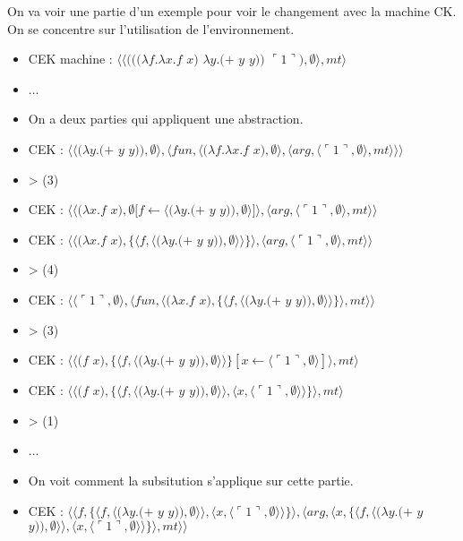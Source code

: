 \documentclass[10pt,a4paper]{article}
\begin{document}
				
				On va voir une partie d'un exemple pour voir le changement avec la machine CK. On se concentre sur l'utilisation de l'environnement.
				\medbreak
				
				\begin{itemize}
					\item[] CEK machine : $\langle\langle(((\lambda f.\lambda x.f$ $x)$ $\lambda y.(+$ $y$ $y))$ $\ulcorner 1\urcorner),\emptyset\rangle,mt\rangle$
					\item[] ...
					\item[] On a deux parties qui appliquent une abstraction.
					\item[] CEK : $\langle\langle(\lambda y.(+$ $y$ $y)),\emptyset\rangle,\langle fun,\langle(\lambda f.\lambda x.f$ $x),\emptyset\rangle,\langle arg,\langle\ulcorner 1\urcorner,\emptyset\rangle,mt\rangle\rangle\rangle$
					\item[] > (3) 
					\item[] CEK : $\langle\langle(\lambda x.f$ $x),\emptyset[f \leftarrow \langle(\lambda y.(+$ $y$ $y)),\emptyset\rangle]\rangle,\langle arg,\langle\ulcorner 1\urcorner,\emptyset\rangle,mt\rangle\rangle$
					\item[] CEK : $\langle\langle(\lambda x.f$ $x),\{\langle f,\langle(\lambda y.(+$ $y$ $y)),\emptyset\rangle\rangle\}\rangle,\langle arg,\langle\ulcorner 1\urcorner,\emptyset\rangle,mt\rangle\rangle$
					\item[] > (4) 
					\item[] CEK : $\langle\langle\ulcorner 1\urcorner,\emptyset\rangle,\langle fun,\langle(\lambda x.f$ $x),\{\langle f,\langle(\lambda y.(+$ $y$ $y)),\emptyset\rangle\rangle\}\rangle,mt\rangle\rangle$
					\item[] > (3) 
					\item[] CEK : $\langle\langle(f$ $x),\{\langle f,\langle(\lambda y.(+$ $y$ $y)),\emptyset\rangle\rangle\}[x \leftarrow \langle\ulcorner 1\urcorner,\emptyset\rangle]\rangle,mt\rangle$
					\item[] CEK : $\langle\langle(f$ $x),\{\langle f,\langle(\lambda y.(+$ $y$ $y)),\emptyset\rangle\rangle,\langle x,\langle\ulcorner 1\urcorner,\emptyset\rangle\rangle\}\rangle,mt\rangle$
					\item[] > (1)
					\item[] ...
					\item[] On voit comment la subsitution s'applique sur cette partie.
					\item[] CEK : $\langle\langle f,\{\langle f,\langle(\lambda y.(+$ $y$ $y)),\emptyset\rangle\rangle,\langle x,\langle\ulcorner 1\urcorner,\emptyset\rangle\rangle\}\rangle,\langle arg,\langle x,\{\langle f,\langle(\lambda y.(+$ $y$ $y)),\emptyset\rangle\rangle,\langle x,\langle\ulcorner 1\urcorner,\emptyset\rangle\rangle\}\rangle,mt\rangle\rangle$

\end{itemize}
\end{document}
